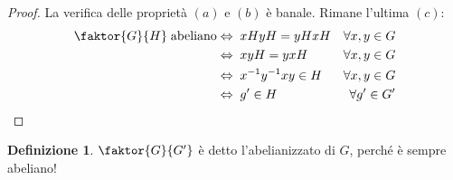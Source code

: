 \documentclass[a4paper]{article}
\theoremstyle{remark}
\theoremstyle{definition}
\newtheorem{definition}[theorem]{Definizione}
\begin{document}
\begin{multicols}{2}
\begin{enumerate}
\begin{enumerate}
		
	\end{enumerate}

\begin{proof}
	La verifica delle proprietà $ (a) $ e $ (b) $ è banale. Rimane l'ultima $ (c) $:
	\begin{align*}
	\faktor{G}{H} \;\text{abeliano} & \Leftrightarrow\; xHyH = yHxH &\forall x, y \in G \\
	& \Leftrightarrow\; xyH = yxH &\forall x, y \in G\\
	& \Leftrightarrow\; x^{-1}y^{-1}xy \in H &\forall x, y \in G\\
	& \Leftrightarrow\; g' \in H &\forall g' \in G'
	\end{align*}
\end{proof}
\begin{definition}
	$ \faktor{G}{G'} $ è detto l'abelianizzato di $ G $, perché è sempre abeliano!
\end{definition}
\end{enumerate}
\end{multicols}
\end{document}
